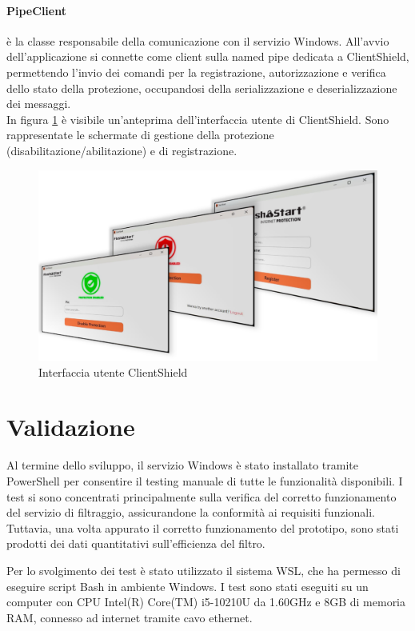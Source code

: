 \documentclass[12pt,a4paper,openright,twoside]{book}
\begin{document}
\paragraph{PipeClient} è la classe responsabile della comunicazione con il servizio Windows.
All'avvio dell'applicazione si connette come client sulla named pipe dedicata a ClientShield, permettendo l'invio dei comandi per la registrazione, autorizzazione e verifica dello stato della protezione, occupandosi della serializzazione e deserializzazione dei messaggi.\\

In figura \ref{fig:schermate-app} è visibile un'anteprima dell'interfaccia utente di ClientShield.
Sono rappresentate le schermate di gestione della protezione (disabilitazione/abilitazione) e di registrazione.
\begin{figure}[H]
	\centering
	\includegraphics[width=1.0\textwidth]{figures/schermate.pdf}
	\caption{Interfaccia utente ClientShield}
	\label{fig:schermate-app}
\end{figure}


\section{Validazione}

Al termine dello sviluppo, il servizio Windows è stato installato tramite PowerShell per consentire il testing manuale di tutte le funzionalità disponibili.
I test si sono concentrati principalmente sulla verifica del corretto funzionamento del servizio di filtraggio, assicurandone la conformità ai requisiti funzionali.
Tuttavia, una volta appurato il corretto funzionamento del prototipo, sono stati prodotti dei dati quantitativi sull'efficienza del filtro.

Per lo svolgimento dei test è stato utilizzato il sistema \gls{WSL}, che ha permesso di eseguire script Bash in ambiente Windows.
I test sono stati eseguiti su un computer con CPU Intel(R) Core(TM) i5-10210U da 1.60GHz e 8GB di memoria RAM, connesso ad internet tramite cavo ethernet.
\end{document}
